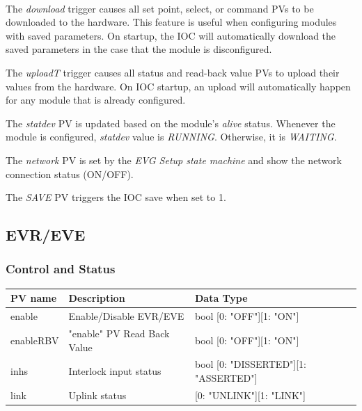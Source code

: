 \documentclass[openany]{article}
\begin{document}
			\paragraph{} The \emph{download} trigger causes all set point, select, or command PVs to be downloaded to the hardware. This feature is useful when configuring modules with saved parameters. On startup, the IOC will automatically download the saved parameters in the case that the module is disconfigured.
			\par The \emph{uploadT} trigger causes all status and read-back value PVs to upload their values from the hardware. On IOC startup, an upload will automatically happen for any module that is already configured.
			\par The \emph{statdev} PV is updated based on the module's \emph{alive} status. Whenever the module is configured, \emph{statdev} value is \emph{RUNNING}. Otherwise, it is \emph{WAITING}.
			\par The \emph{network} PV is set by the \emph{EVG Setup state machine} and show the network connection status (ON/OFF).
			\par The \emph{SAVE} PV triggers the IOC save when set to 1.

	\subsection{EVR/EVE}

	\etoclocalframed[1]{}

		\subsubsection{Control and Status}\label{pvgroup:evre-control-status}
			\begin{center}
			\begin{tabular}{| m{2.8cm} m{6cm} m{6cm} |}
			    \hline
			    \bfseries PV name & \bfseries Description & \bfseries Data Type \\ \hline
			    enable & Enable/Disable EVR/EVE & bool [0: "OFF"][1: "ON"] \\ \hline
			    enableRBV & "enable" PV Read Back Value & bool [0: "OFF"][1: "ON"] \\ \hline
			    inhs & Interlock input status & bool [0: "DISSERTED"][1: "ASSERTED"] \\ \hline
			    link & Uplink status & [0: "UNLINK"][1: "LINK"] \\ \hline
			\end{tabular}
			\end{center}
\end{document}
